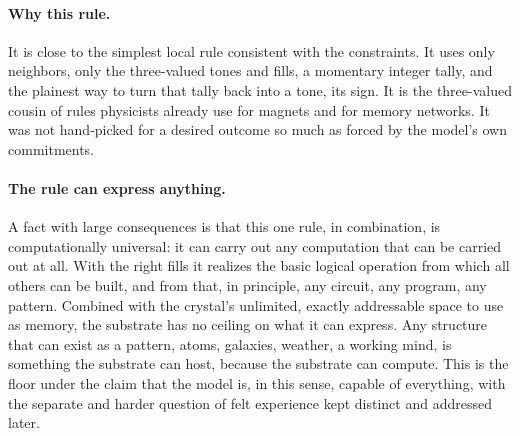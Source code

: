 \paragraph{Why this rule.}
It is close to the simplest local rule consistent with the constraints. It uses only
neighbors, only the three-valued tones and fills, a momentary integer tally, and the plainest
way to turn that tally back into a tone, its sign. It is the three-valued cousin of rules
physicists already use for magnets and for memory networks. It was not hand-picked for a
desired outcome so much as forced by the model's own commitments.

\paragraph{The rule can express anything.}
A fact with large consequences is that this one rule, in combination, is computationally
universal: it can carry out any computation that can be carried out at all. With the right
fills it realizes the basic logical operation from which all others can be built, and from
that, in principle, any circuit, any program, any pattern. Combined with the crystal's
unlimited, exactly addressable space to use as memory, the substrate has no ceiling on what it
can express. Any structure that can exist as a pattern, atoms, galaxies, weather, a working
mind, is something the substrate can host, because the substrate can compute. This is the
floor under the claim that the model is, in this sense, capable of everything, with the
separate and harder question of felt experience kept distinct and addressed later.
